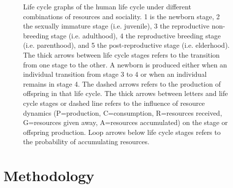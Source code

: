 \documentclass{article}
\begin{document}
\begin{figure}[H]
\caption{Life cycle graphs of the human life cycle under different combinations of resources and sociality. 1 is the newborn stage, 2 the sexually immature stage (i.e. juvenile), 3 the reproductive non-breeding stage (i.e. adulthood), 4 the reproductive breeding stage (i.e. parenthood), and 5 the post-reproductive stage (i.e. elderhood). The thick arrows between life cycle stages refers to the transition from one stage to the other. A newborn is produced either when an individual transition from stage 3 to 4 or when an individual remains in stage 4. The dashed arrows refers to the production of offspring in that life cycle. The thick arrows between letters and life cycle stages or dashed line refers to the influence of resource dynamics (P=production, C=consumption, R=resources received, G=resources given away, A=resources accumulated) on the stage or offspring production. Loop arrows below life cycle stages refers to the probability of accumulating resources.}
    \label{fig:2}
\end{figure}


\section{Methodology}
\end{document}
